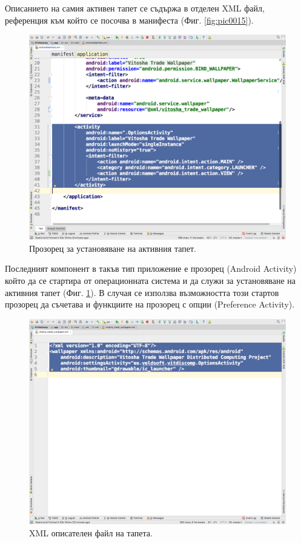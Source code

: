 \documentclass[book,14pt,oneside,openany]{memoir}
\begin{document}
Описанието на самия активен тапет се съдържа в отделен XML файл, референция към който се посочва в манифеста (Фиг. \ref{fig:pic0015}).

\begin{figure}[h]
  \centering
  \includegraphics[height=0.45\pdfpageheight]{pic0016}
  \caption{Прозорец за установяване на активния тапет.}
\label{fig:pic0016}
\end{figure}
\FloatBarrier

Последният компонент в такъв тип приложение е прозорец (Android Activity) който да се стартира от операционната система и да служи за установяване на активния тапет (Фиг. \ref{fig:pic0016}). В случая се използва възможността този стартов прозорец да съчетава и функциите на прозорец с опции (Preference Activity).

\begin{figure}[h]
  \centering
  \includegraphics[height=0.45\pdfpageheight]{pic0017}
  \caption{XML описателен файл на тапета.}
\label{fig:pic0017}
\end{figure}
\FloatBarrier
\end{document}

